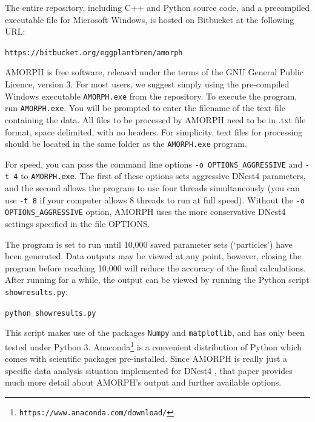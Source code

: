 \documentclass[review]{elsarticle}
\newcommand{\changed}{\color{blue}}
\begin{document}
The entire repository, including C++ and Python source code, and a 
precompiled executable file for Microsoft Windows,
is hosted on Bitbucket at the following URL:

\vspace{1em}
{\tt https://bitbucket.org/eggplantbren/amorph}
\vspace{1em}

AMORPH is free software, released under the terms of the GNU General Public
Licence, version 3.
For most users, we suggest simply using the pre-compiled Windows executable
{\tt AMORPH.exe} from the repository. To execute the program,
run {\tt AMORPH.exe}. You will be prompted to enter the filename of the text
file containing the data. All files to be processed by AMORPH need to be in .txt file format, space delimited, with no headers. For simplicity, text files for processing should be located in the same folder as the {\tt AMORPH.exe} program.

{\changed 
For speed, you can pass the command line options {\tt -o OPTIONS\_AGGRESSIVE} and
{\tt -t 4} to {\tt AMORPH.exe}. The first of these options sets aggressive
DNest4 parameters, and the second allows the program to use four threads
simultaneously (you can use {\tt -t 8} if your computer allows 8 threads to run
at full speed). Without the {\tt -o OPTIONS\_AGGRESSIVE} option, AMORPH uses
the more conservative DNest4 settings specified in the file OPTIONS.
}

The program is set to run until 10,000 saved parameter sets
{\changed (`particles')} have been generated. Data outputs may be viewed at any point, however, closing the program before reaching 10,000 will reduce the accuracy of the final calculations. After running for a while, the output can be viewed
by running the Python script {\tt showresults.py}:

\vspace{1em}
{\tt python showresults.py}
\vspace{1em}

This script makes use of the packages {\tt Numpy} and {\tt matplotlib},
and has only been tested under Python 3. Anaconda\footnote{\tt https://www.anaconda.com/download/} is a convenient distribution
of Python which comes with scientific packages pre-installed.
Since AMORPH is really just a specific data analysis situation implemented
for DNest4 \citep{dnest4}, that paper provides much more detail about
AMORPH's output and further available options.
\end{document}
